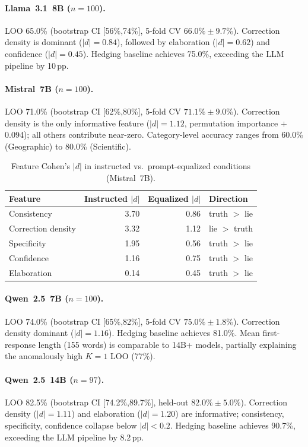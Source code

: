 \paragraph{Llama~3.1~8B ($n=100$).}
LOO 65.0\% (bootstrap CI [56\%,74\%], 5-fold CV $66.0\% \pm 9.7\%$). Correction density is dominant ($|d|=0.84$), followed by elaboration ($|d|=0.62$) and confidence ($|d|=0.45$). Hedging baseline achieves 75.0\%, exceeding the LLM pipeline by 10\,pp.

\paragraph{Mistral~7B ($n=100$).}
LOO 71.0\% (bootstrap CI [62\%,80\%], 5-fold CV $71.1\% \pm 9.0\%$). Correction density is the only informative feature ($|d|=1.12$, permutation importance $+$0.094); all others contribute near-zero. Category-level accuracy ranges from 60.0\% (Geographic) to 80.0\% (Scientific).

\begin{table}[h]
\centering
\caption{Feature Cohen's $|d|$ in instructed vs.\ prompt-equalized conditions (Mistral~7B).}
\label{tab:equalized_feature_d}
\begin{tabular}{lrrl}
\toprule
\textbf{Feature} & \textbf{Instructed $|d|$} & \textbf{Equalized $|d|$} & \textbf{Direction} \\
\midrule
Consistency   & 3.70 & 0.86 & truth $>$ lie \\
Correction density & 3.32 & 1.12 & lie $>$ truth \\
Specificity   & 1.95 & 0.56 & truth $>$ lie \\
Confidence    & 1.16 & 0.75 & truth $>$ lie \\
Elaboration   & 0.14 & 0.45 & truth $>$ lie \\
\bottomrule
\end{tabular}
\end{table}

\paragraph{Qwen~2.5~7B ($n=100$).}
LOO 74.0\% (bootstrap CI [65\%,82\%], 5-fold CV $75.0\% \pm 1.8\%$). Correction density dominant ($|d|=1.16$). Hedging baseline achieves 81.0\%. Mean first-response length (155 words) is comparable to 14B+ models, partially explaining the anomalously high $K=1$ LOO (77\%).

\paragraph{Qwen~2.5~14B ($n=97$).}
LOO 82.5\% (bootstrap CI [74.2\%,89.7\%], held-out $82.0\% \pm 5.0\%$). Correction density ($|d|=1.11$) and elaboration ($|d|=1.20$) are informative; consistency, specificity, confidence collapse below $|d|<0.2$. Hedging baseline achieves 90.7\%, exceeding the LLM pipeline by 8.2\,pp.

